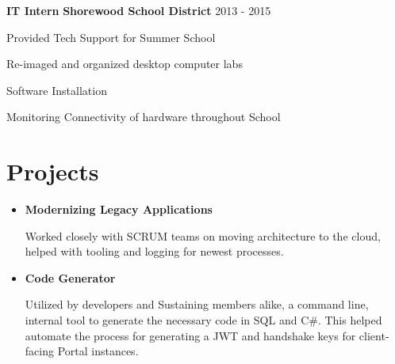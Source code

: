 \documentclass[a4paper]{mctemplate} %
\begin{document}
\begin{main}
    {{\textbf{IT Intern}} \hfill \footnotesize{{\textbf{Shorewood School District}} 2013 - 2015}}

\begin{itemize}[noitemsep]
    {
        \item Provided Tech Support for Summer School 
        \item Re-imaged and organized desktop computer labs
        \item Software Installation
        \item Monitoring Connectivity of hardware throughout School
    }
\end{itemize}
\vspace{.3cm}





\section{Projects}
\vspace{-.2cm}

\begin{itemize}
    \item \textbf{Modernizing Legacy Applications}
    \hfill 

    Worked closely with SCRUM teams on moving architecture to the cloud, helped with tooling and logging for newest processes. 
    

    \item \textbf{Code Generator}
    \hfill 

    Utilized by developers and Sustaining members alike, a command line, internal tool to generate the necessary code in SQL and C\#. This helped automate the process for generating a JWT and handshake keys for client-facing Portal instances.
     

\end{itemize}
\end{main}
\end{document}
